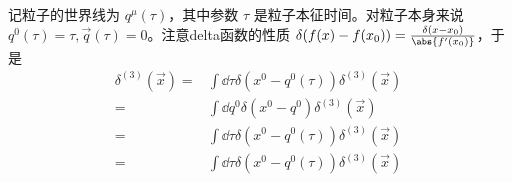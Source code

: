记粒子的世界线为 $q^\mu(\tau)$，其中参数 $\tau$ 是粒子本征时间。对粒子本身来说 $q^0(\tau)=\tau,\vec q(\tau)=0$。注意delta函数的性质 $\delta(f(x)-f(x_0))=\frac{\delta(x-x_0)}{\abs{f'(x_0)}}$，于是
\begin{equation}
\begin{aligned}
\delta^{(3)}(\vec x)=&\int\dd \tau\delta(x^0-q^0(\tau))\delta^{(3)}(\vec x)\\
=&\int\dd q^0\delta(x^0-q^0)\delta^{(3)}(\vec x)\\
=&\int\dd\tau\delta(x^0-q^0(\tau))\delta^{(3)}(\vec x)\\
=&\int\dd \tau\delta(x^0-q^0(\tau))\delta^{(3)}(\vec x)\\
\end{aligned}~
\end{equation}




















